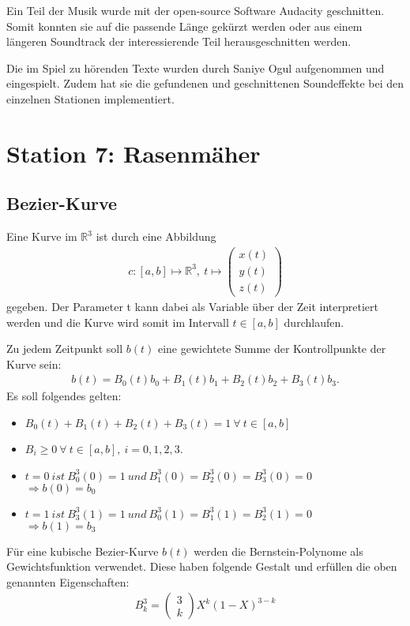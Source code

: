 Ein Teil der Musik wurde mit der open-source Software Audacity geschnitten. Somit konnten sie auf die passende Länge gekürzt werden oder aus einem längeren Soundtrack der interessierende Teil herausgeschnitten werden. 

Die im Spiel zu hörenden Texte wurden durch Saniye Ogul aufgenommen und eingespielt. Zudem hat sie die gefundenen und geschnittenen Soundeffekte bei den einzelnen Stationen implementiert.


\section{Station 7: Rasenmäher}
\subsection{Bezier-Kurve}
Eine Kurve im $\mathbb{R}^3$ ist durch eine Abbildung 
\begin{align}
	\label{KurveimRaum}
	c:[a,b] \mapsto \mathbb{R}^3, ~ t \mapsto \begin{pmatrix}
		x(t)\\
		y(t)\\
		z(t)
	\end{pmatrix}
\end{align}
gegeben. Der Parameter t kann dabei als Variable über der Zeit interpretiert werden und die Kurve wird somit im Intervall $t\in[a, b]$ durchlaufen.

Zu jedem Zeitpunkt soll $b(t)$ eine gewichtete Summe der Kontrollpunkte der Kurve sein:
\begin{align}
	b(t) = B_0(t)b_0 + B_1(t)b_1 + B_2(t)b_2+B_3(t)b_3.
\end{align}
Es soll folgendes gelten:
\begin{itemize}
	\item $B_0(t) + B_1(t) + B_2(t) + B_3(t) = 1 ~ \forall ~ t \in [a, b]$
	\item $B_i \geq 0 ~ \forall ~ t \in [a, b], ~ i=0, 1, 2, 3$.
	\item $t=0 ~ ist ~ B_0^3(0)=1 ~ und ~ B_1^3(0)=B_2^3(0)=B_3^3(0)=0$ \\$\Rightarrow b(0)=b_0$
	\item $t=1 ~ ist ~ B_3^3(1)=1 ~ und ~ B_0^3(1)=B_1^3(1)=B_2^3(1)=0$ \\$\Rightarrow b(1) = b_3$
\end{itemize}

Für eine kubische Bezier-Kurve $b(t)$ werden die Bernstein-Polynome als Gewichtsfunktion verwendet. Diese haben folgende Gestalt und erfüllen die oben genannten Eigenschaften: \cite{BezierKurven_Theorie}
\begin{align}
	B_k^3 = \begin{pmatrix}
		3\\
		k
	\end{pmatrix} X^k(1-X)^{3-k}
\end{align}


